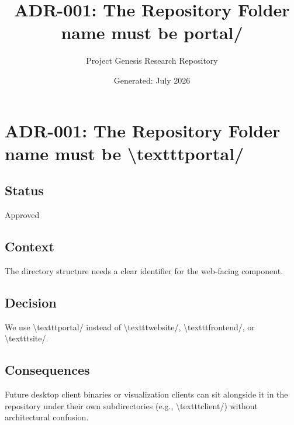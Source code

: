 \documentclass[11pt,a4paper]{article}
\title{\textbf{ADR-001: The Repository Folder name must be portal/}}
\author{Project Genesis Research Repository}
\date{\small Generated: July 2026}
\begin{document}
\maketitle
\thispagestyle{empty}

\newpage
\section*{ADR-001: The Repository Folder name must be \textbackslash{}texttt{portal/}}

\subsection*{Status}
Approved

\subsection*{Context}
The directory structure needs a clear identifier for the web-facing component.

\subsection*{Decision}
We use \textbackslash{}texttt{portal/} instead of \textbackslash{}texttt{website/}, \textbackslash{}texttt{frontend/}, or \textbackslash{}texttt{site/}.

\subsection*{Consequences}
Future desktop client binaries or visualization clients can sit alongside it in the repository under their own subdirectories (e.g., \textbackslash{}texttt{client/}) without architectural confusion.
\end{document}

